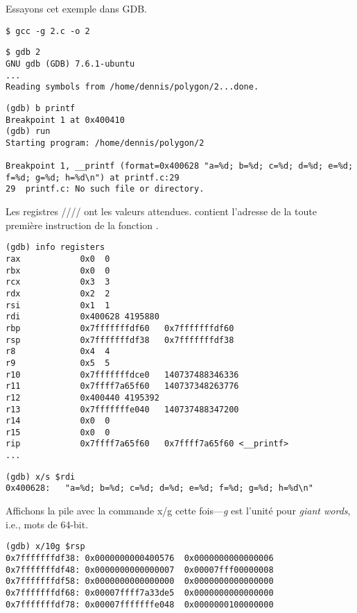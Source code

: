 


Essayons cet exemple dans \ac{GDB}.

\begin{lstlisting}
$ gcc -g 2.c -o 2
\end{lstlisting}

\begin{lstlisting}
$ gdb 2
GNU gdb (GDB) 7.6.1-ubuntu
...
Reading symbols from /home/dennis/polygon/2...done.
\end{lstlisting}

\begin{lstlisting}[caption=mettons le point d'arrêt à \printf{,} et lançons]
(gdb) b printf
Breakpoint 1 at 0x400410
(gdb) run
Starting program: /home/dennis/polygon/2 

Breakpoint 1, __printf (format=0x400628 "a=%d; b=%d; c=%d; d=%d; e=%d; f=%d; g=%d; h=%d\n") at printf.c:29
29	printf.c: No such file or directory.
\end{lstlisting}

Les registres \RSI/\RDX/\RCX// ont les valeurs attendues.
\RIP contient l'adresse de la toute première instruction de la fonction \printf.

\begin{lstlisting}
(gdb) info registers
rax            0x0	0
rbx            0x0	0
rcx            0x3	3
rdx            0x2	2
rsi            0x1	1
rdi            0x400628	4195880
rbp            0x7fffffffdf60	0x7fffffffdf60
rsp            0x7fffffffdf38	0x7fffffffdf38
r8             0x4	4
r9             0x5	5
r10            0x7fffffffdce0	140737488346336
r11            0x7ffff7a65f60	140737348263776
r12            0x400440	4195392
r13            0x7fffffffe040	140737488347200
r14            0x0	0
r15            0x0	0
rip            0x7ffff7a65f60	0x7ffff7a65f60 <__printf>
...
\end{lstlisting}

\begin{lstlisting}[caption=inspectons la chaîne de format]
(gdb) x/s $rdi
0x400628:	"a=%d; b=%d; c=%d; d=%d; e=%d; f=%d; g=%d; h=%d\n"
\end{lstlisting}

Affichons la pile avec la commande x/g cette fois---\emph{g} est l'unité pour \emph{giant words}, i.e., mots de 64-bit.

\begin{lstlisting}
(gdb) x/10g $rsp
0x7fffffffdf38:	0x0000000000400576	0x0000000000000006
0x7fffffffdf48:	0x0000000000000007	0x00007fff00000008
0x7fffffffdf58:	0x0000000000000000	0x0000000000000000
0x7fffffffdf68:	0x00007ffff7a33de5	0x0000000000000000
0x7fffffffdf78:	0x00007fffffffe048	0x0000000100000000
\end{lstlisting}

